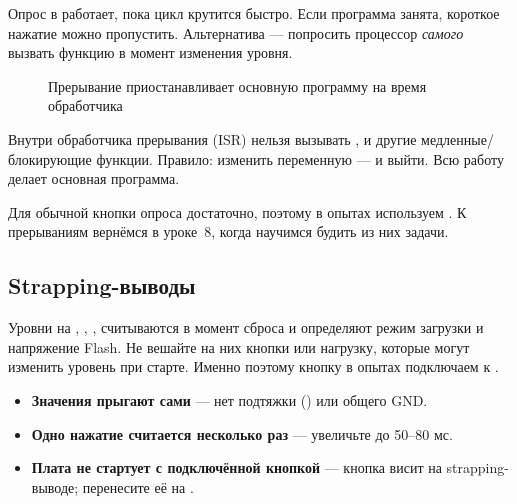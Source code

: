 Опрос в  работает, пока цикл крутится быстро. Если программа занята, короткое
нажатие можно пропустить. Альтернатива --- попросить процессор \emph{самого} вызвать функцию
в момент изменения уровня.

\begin{figure}[H]
\centering
{}
\caption{Прерывание приостанавливает основную программу на время обработчика}
\end{figure}


\begin{caution}
Внутри обработчика прерывания (ISR) нельзя вызывать ,  и другие
медленные/блокирующие функции. Правило: изменить переменную --- и выйти. Всю работу делает основная программа.
\end{caution}

Для обычной кнопки опроса достаточно, поэтому в опытах используем . К прерываниям
вернёмся в уроке~8, когда научимся будить из них задачи.

\subsection{Strapping-выводы}

Уровни на , , ,  считываются в момент сброса и определяют режим загрузки
и напряжение Flash. Не вешайте на них кнопки или нагрузку, которые могут изменить уровень при старте.
Именно поэтому кнопку в опытах подключаем к .

\begin{trouble}
\begin{itemize}[leftmargin=*]
  \item \textbf{Значения прыгают сами} --- нет подтяжки () или общего GND.
  \item \textbf{Одно нажатие считается несколько раз} --- увеличьте  до 50--80 мс.
  \item \textbf{Плата не стартует с подключённой кнопкой} --- кнопка висит на strapping-выводе; перенесите её на .
\end{itemize}
\end{trouble}

